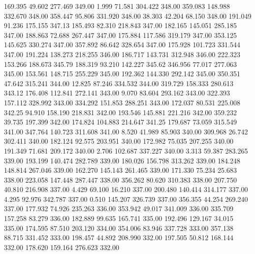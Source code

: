  169.395   49.602  277.469       349.00
   1.999   71.581  304.422       348.00
 359.083  148.988  332.670       348.00
 358.447   95.806  331.920       348.00
  38.303   42.204   68.150       348.00
 191.049   91.236  175.155       347.13
 185.493   82.310  218.843       347.00
 182.165  145.051  285.185       347.00
 188.863   72.688  267.447       347.00
 175.884  117.586  319.179       347.00
 353.125  145.625  330.274       347.00
 357.892   86.642  328.654       347.00
 175.928  101.723  331.544       347.00
 191.224  138.273  218.255       346.00
 186.717  143.731  312.948       346.00
 222.323  153.266  188.673       345.79
 188.319   93.210  142.227       345.62
 346.956   77.017  277.063       345.00
 153.561  148.715  255.229       345.00
 192.362  144.330  292.142       345.00
 350.351   47.642  315.241       344.00
  12.825   87.246  334.532       344.00
 319.729  158.333  280.613       343.12
 176.408  112.841  272.141       343.00
   9.070   83.604  293.162       343.00
 322.393  157.112  328.992       343.00
 334.292  151.853  288.251       343.00
 172.037   80.531  225.008       342.25
  94.910  158.190  218.831       342.00
 193.546  145.881  221.216       342.00
 359.232   39.735  197.399       342.00
 174.824  104.883  214.647       341.25
 179.687   73.059  315.549       341.00
 347.764  140.723  311.608       341.00
   8.520   41.989   85.903       340.00
 309.968   26.742  302.411       340.00
 182.124   92.575  203.951       340.00
 172.982   75.035  207.255       340.00
 191.349   71.681  209.172       340.00
   2.706  102.687  337.227       340.00
   3.313   59.387  283.265       339.00
 193.199  140.474  282.789       339.00
 180.026  156.798  313.262       339.00
 184.248  148.814  267.046       339.00
 162.270  145.143  261.465       339.00
 171.330   75.234   25.683       338.00
 223.058  147.448  287.447       338.00
 356.262   80.620  310.383       338.00
 207.750   40.810  216.908       337.00
   4.429   69.100   16.210       337.00
 200.480  140.414  314.177       337.00
   4.295   92.976  342.787       337.00
   0.510  145.207  326.739       337.00
 356.355   44.254  269.240       337.00
 177.932   74.926  235.263       336.00
 353.942   49.017  341.009       336.00
 335.709  157.258   83.279       336.00
 182.889   99.635  165.741       335.00
 192.496  129.167   34.015       335.00
 174.595   87.510  203.120       334.00
 354.006   83.946  337.728       333.00
 357.138   88.715  331.452       333.00
 198.457   44.892  208.990       332.00
 197.505   50.812  168.144       332.00
 178.620  159.164  276.623       332.00
